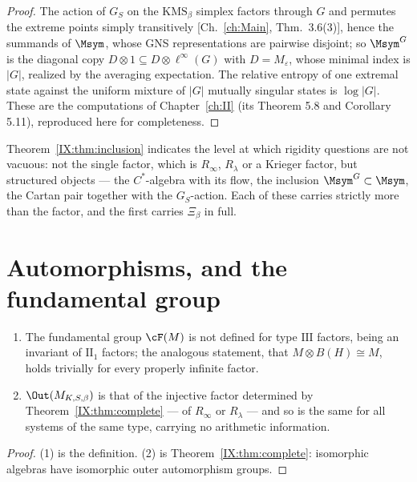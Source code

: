 \begin{proof}
The action of $G_S$ on the $\mathrm{KMS}_\beta$ simplex factors through $G$ and permutes the
extreme points simply transitively [Ch.~\ref{ch:Main}, Thm.~3.6(3)], hence the summands of $\Msym$,
whose GNS representations are pairwise disjoint; so $\Msym^G$ is the diagonal copy
$D\otimes1\subseteq D\otimes\ell^\infty(G)$ with $D=M_\varepsilon$, whose minimal index is
$|G|$, realized by the averaging expectation. The relative entropy of one extremal state
against the uniform mixture of $|G|$ mutually singular states is $\log|G|$. These are the
computations of Chapter~\ref{ch:II} (its Theorem 5.8 and Corollary 5.11), reproduced
here for completeness.
\end{proof}

\begin{remark}\label{IX:rem:whererigidity}
Theorem~\ref{IX:thm:inclusion} indicates the level at which rigidity questions are not
vacuous: not the single factor, which is $R_\infty$, $R_\lambda$ or a Krieger factor, but
structured objects --- the $C^*$-algebra with its flow, the inclusion $\Msym^G\subset\Msym$,
the Cartan pair together with the $G_S$-action. Each of these carries strictly more than the factor, and the
first carries $\Xi_\beta$ in full.
\end{remark}

\section{Automorphisms, and the fundamental group}

\begin{proposition}\label{IX:prop:degenerate}
\begin{enumerate}
\item The fundamental group $\cF(M)$ is not defined for type $\mathrm{III}$ factors, being an
invariant of $\mathrm{II}_1$ factors; the analogous statement, that $M\otimes B(H)\cong M$,
holds trivially for every properly infinite factor.
\item $\Out(M_{K,S,\beta})$ is that of the injective factor determined by
Theorem~\ref{IX:thm:complete} --- of $R_\infty$ or $R_\lambda$ --- and so is the same for all
systems of the same type, carrying no arithmetic information.
\end{enumerate}
\end{proposition}

\begin{proof}
(1) is the definition. (2) is Theorem~\ref{IX:thm:complete}: isomorphic algebras have isomorphic
outer automorphism groups.
\end{proof}

